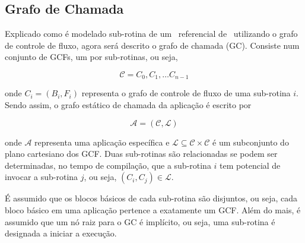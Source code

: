 \subsection{Grafo de Chamada} \label{sec:gc}
		\cite{Arato2003, Arato2005} \cite{Mann2007} \cite{Hassine2017}  
        
        Explicado como é modelado sub-rotina de um \design\ referencial de \software\ utilizando o grafo de controle de fluxo, agora será descrito o grafo de chamada (GC). Consiste num conjunto de GCFs, um por sub-rotinas, ou seja,

		\begin{equation}
			\mathcal{C} = {C_0, C_1, \dots C_{n-1}}
		\end{equation}

		onde $ C_i = (B_i, F_i) $ representa o grafo de controle de fluxo de uma sub-rotina $ i $. Sendo assim, o grafo estático de chamada da aplicação é escrito por

		\begin{equation}
			\mathcal{A} = (\mathcal{C}, \mathcal{L}) \label{eq:a}
		\end{equation}

		onde $ \mathcal{A}$ representa uma aplicação específica e $ \mathcal{L} \subseteq \mathcal{C} \times \mathcal{C} $ é um subconjunto do plano cartesiano dos GCF. Duas sub-rotinas são relacionadas se podem ser determinadas, no tempo de compilação, que a sub-rotina $ i $ tem potencial de invocar a sub-rotina $ j $, ou seja, $ (C_i, C_j) \in \mathcal{L} $.

		É assumido que os blocos básicos de cada sub-rotina são disjuntos, ou seja, cada bloco básico em uma aplicação pertence a exatamente um GCF. Além do mais, é assumido que um nó raiz para o GC é implícito, ou seja, uma sub-rotina é designada a iniciar a execução.


